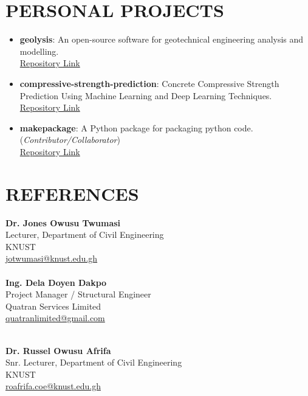 \documentclass[letterpaper, 12pt]{article}
\newcommand{\cvsection}[1]{

	\section*{#1}
}
\begin{document}

	\cvsection{PERSONAL PROJECTS}

	\begin{itemize}[leftmargin=*]

		\item \textbf{geolysis}: An open-source software for geotechnical engineering analysis and modelling. \\ \href{https://www.github.com/patrickboateng/geolysis}{Repository Link}

		\item \textbf{compressive-strength-prediction}: Concrete Compressive Strength Prediction Using Machine Learning and Deep Learning Techniques. \href{https://github.com/patrickboateng/compressive-strength-prediction}{Repository Link}

		\item \textbf{makepackage}: A Python package for packaging python code. (\textit{Contributor/Collaborator}) \\
		\href{https://github.com/nyggus/makepackage/graphs/contributors}{Repository Link}

	\end{itemize}


	\cvsection{REFERENCES}


	\begin{multicols}{2}
		\textbf{Dr. Jones Owusu Twumasi} \\
		Lecturer, Department of Civil Engineering \\
		KNUST \\
		\faEnvelopeSquare \space \href{mailto:jotwumasi@knust.edu.gh}{jotwumasi@knust.edu.gh} \\
		\faPhone {} \\

		\textbf{Ing. Dela Doyen Dakpo} \\
		Project Manager / Structural Engineer \\
		Quatran Services Limited \\
		\faEnvelopeSquare \space \href{mailto:quatranlimited@gmail.com}{quatranlimited@gmail.com} \\
		\faPhone {} \\

		\columnbreak

		\textbf{Dr. Russel Owusu Afrifa} \\
		Snr. Lecturer, Department of Civil Engineering \\
		KNUST \\
		\faEnvelopeSquare \space \href{mailto:roafrifa.coe@knust.edu.gh}{roafrifa.coe@knust.edu.gh} \\
		\faPhone {} \\

	\end{multicols}
\end{document}

